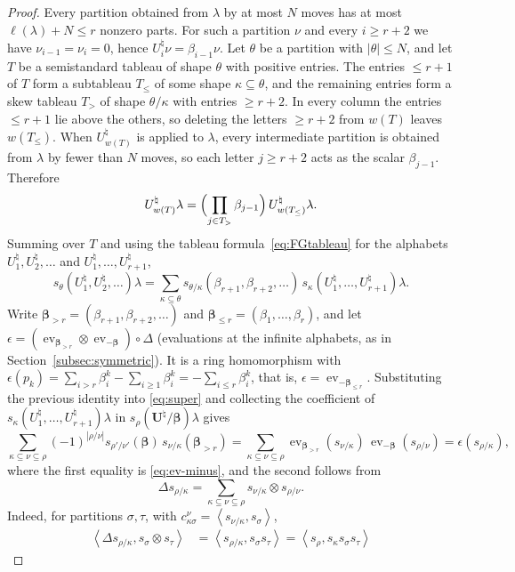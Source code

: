 \documentclass[11pt]{amsart}
\numberwithin{equation}{section}
\theoremstyle{definition}
\theoremstyle{remark}
\newcommand{\ev}{\operatorname{ev}}
\newcommand{\bfU}{\mathbf U}
\newcommand{\bbeta}{\boldsymbol\beta}
\newcommand{\Hall}[2]{\left\langle #1,#2\right\rangle}
\begin{document}
\begin{proof}
Every partition obtained from $\lambda$ by at most $N$ moves has at most
$\ell(\lambda)+N\leq r$ nonzero parts. For such a partition $\nu$ and every
$i\geq r+2$ we have $\nu_{i-1}=\nu_i=0$, hence
$U^\natural_i\nu=\beta_{i-1}\nu$. Let $\theta$ be a partition with
$|\theta|\leq N$, and let $T$ be a semistandard tableau of shape $\theta$ with
positive entries. The entries $\leq r+1$ of $T$ form a subtableau
$T_{\leq}$ of some shape $\kappa\subseteq\theta$, and the remaining entries
form a skew tableau $T_>$ of shape $\theta/\kappa$ with entries $\geq r+2$.
In every column the entries $\leq r+1$ lie above the others, so deleting
the letters $\geq r+2$ from $w(T)$ leaves $w(T_{\leq})$. When
$U^\natural_{w(T)}$ is applied to $\lambda$, every intermediate partition is
obtained from $\lambda$ by fewer than $N$ moves, so each letter $j\geq r+2$
acts as the scalar $\beta_{j-1}$. Therefore
\[
 U^\natural_{w(T)}\lambda=\Bigl(\prod_{j\in T_>}\beta_{j-1}\Bigr)\,
 U^\natural_{w(T_{\leq})}\lambda .
\]
Summing over $T$ and using the tableau formula~\eqref{eq:FGtableau} for the
alphabets $U^\natural_1,U^\natural_2,\dots$ and
$U^\natural_1,\dots,U^\natural_{r+1}$,
\[
 s_\theta(U^\natural_1,U^\natural_2,\dots)\lambda
 =\sum_{\kappa\subseteq\theta}s_{\theta/\kappa}(\beta_{r+1},\beta_{r+2},\dots)\,
  s_\kappa(U^\natural_1,\dots,U^\natural_{r+1})\lambda .
\]
Write $\bbeta_{>r}=(\beta_{r+1},\beta_{r+2},\dots)$ and
$\bbeta_{\leq r}=(\beta_1,\dots,\beta_r)$, and let
$\epsilon=(\ev_{\bbeta_{>r}}\otimes\ev_{-\bbeta})\circ\Delta$ (evaluations at the
infinite alphabets, as in Section~\ref{subsec:symmetric}). It is a ring
homomorphism with
$\epsilon(p_k)=\sum_{i>r}\beta_i^k-\sum_{i\geq1}\beta_i^k=-\sum_{i\leq r}\beta_i^k$,
that is, $\epsilon=\ev_{-\bbeta_{\leq r}}$. Substituting the previous identity into
\eqref{eq:super} and collecting the coefficient of
$s_\kappa(U^\natural_1,\dots,U^\natural_{r+1})\lambda$ in
$s_\rho(\bfU^\natural/\bbeta)\lambda$ gives
\[
 \sum_{\kappa\subseteq\nu\subseteq\rho}(-1)^{|\rho/\nu|}
 s_{\rho'/\nu'}(\bbeta)\,s_{\nu/\kappa}(\bbeta_{>r})
 =\sum_{\kappa\subseteq\nu\subseteq\rho}\ev_{\bbeta_{>r}}(s_{\nu/\kappa})\,\ev_{-\bbeta}(s_{\rho/\nu})
 =\epsilon(s_{\rho/\kappa}),
\]
where the first equality is \eqref{eq:ev-minus}, and the second follows from
\[
 \Delta s_{\rho/\kappa}=\sum_{\kappa\subseteq\nu\subseteq\rho}s_{\nu/\kappa}\otimes s_{\rho/\nu}.
\]
Indeed, for partitions $\sigma,\tau$, with $c^\nu_{\kappa\sigma}=\Hall{s_{\nu/\kappa}}{s_\sigma}$,
\begin{align*}
 \Hall{\Delta s_{\rho/\kappa}}{s_\sigma\otimes s_\tau}
 &=\Hall{s_{\rho/\kappa}}{s_\sigma s_\tau}=\Hall{s_\rho}{s_\kappa s_\sigma s_\tau}

\end{align*}
\end{proof}
\end{document}
